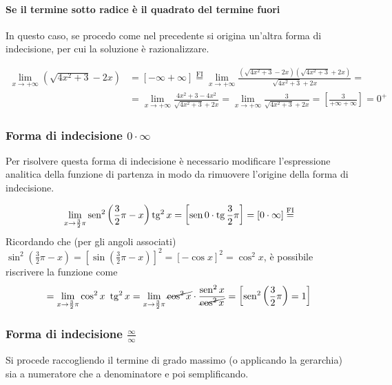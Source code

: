 \paragraph{Se il termine sotto radice è il quadrato del termine fuori}
In questo caso, se procedo come nel precedente si origina un'altra forma di indecisione, per cui la soluzione è razionalizzare.
\begin{ex}
\[\begin{aligned}\lim_{x\to +\infty}\left(\sqrt{4x^2+3}-2x\right)&=[-\infty+\infty]\overset{\mathrm{FI}}{=}\lim_{x\to +\infty}\frac{\left(\sqrt{4x^2+3}-2x\right)\left(\sqrt{4x^2+3}+2x\right)}{\sqrt{4x^2+3}+2x} = \\ &=\lim_{x\to +\infty}\frac{4x^2+3-4x^2}{\sqrt{4x^2+3}+2x}=\lim_{x\to +\infty}\frac{3}{\sqrt{4x^2+3}+2x}=\left[\frac{3}{+\infty+\infty}\right]=0^ +\end{aligned}\]
\end{ex}
\subsubsection{Forma di indecisione $0\cdot \infty$}
Per risolvere questa forma di indecisione è necessario modificare l'espressione analitica della funzione di partenza in modo da rimuovere l'origine della forma di indecisione.
\begin{ex}
\[\lim_{x\to\frac{3}{2}\pi}\operatorname{sen}^2\left(\frac{3}{2}\pi-x\right)\operatorname{tg}^2x=\left[\operatorname{sen} 0 \cdot \operatorname{tg} \frac{3}{2}\pi\right]=[0\cdot \infty]\overset{\mathrm{FI}}{ = }\]
Ricordando che (per gli angoli associati) $\textstyle\sin^2\left(\frac{3}{2}\pi-x\right)= \left[\sin\left(\frac{3}{2}\pi-x\right)\right]^2=[-\cos x]^2=\cos^2 x$, è possibile riscrivere la funzione come \\ 
\[=\lim_{x\to\frac{3}{2}\pi}\cos^2x~\operatorname{tg}^2x = \lim_{x\to\frac{3}{2}\pi} \cancel{\cos^2x}\cdot\frac{\operatorname{sen}^2x}{\cancel{\cos^2x}}=\left[ \operatorname{sen}^2 \left( \frac{3}{2}\pi \right)=1\right]\]
\end{ex}
\subsubsection{Forma di indecisione $\frac{\infty}{\infty}$}
Si procede raccogliendo il termine di grado massimo (o applicando la gerarchia) sia a numeratore che a denominatore e poi semplificando.
